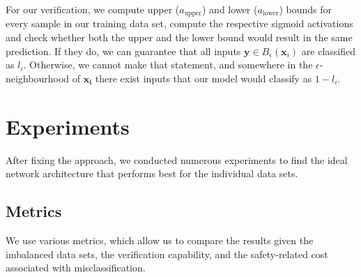 \documentclass[acmsmall,nonacm]{acmart}
\begin{document}
For our verification, we compute upper ($a_{\text{upper}}$) and lower ($a_{\text{lower}}$) bounds for every sample in our training data set, compute the respective sigmoid activations and check whether both the upper and the lower bound would result in the same prediction. If they do, we can guarantee that all inputs $\mathbf{y} \in B_\epsilon(\mathbf{x}_i)$ are classified as $l_i$. Otherwise, we cannot make that statement, and somewhere in the $\epsilon$-neighbourhood of $\mathbf{x_i}$ there exist inputs that our model would classify as $1-l_i$.

\section{Experiments}

After fixing the approach, we conducted numerous experiments to find the ideal network architecture that performs best for the individual data sets.

\subsection{Metrics}
We use various metrics, which allow us to compare the results given the imbalanced data sets, the verification capability, and the safety-related cost associated with misclassification.
\end{document}
